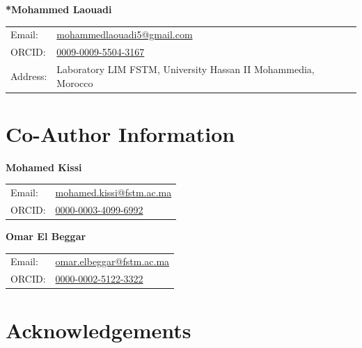 \documentclass[a4paper,12pt]{article}
\begin{document}
\textbf{*Mohammed Laouadi}

\begin{tabular}{ll}
    Email: & \href{mailto:mohammedlaouadi5@gmail.com}{mohammedlaouadi5@gmail.com} \\
    ORCID: & \href{https://orcid.org/0009-0009-5504-3167}{0009-0009-5504-3167} \\
    Address: & Laboratory LIM FSTM, University Hassan II Mohammedia, Morocco \\
\end{tabular}

\vspace{1cm}

\section*{Co-Author Information}

\textbf{Mohamed Kissi}

\begin{tabular}{ll}
    Email: & \href{mailto:mohamed.kissi@fstm.ac.ma}{mohamed.kissi@fstm.ac.ma} \\
    ORCID: & \href{https://orcid.org/0000-0003-4099-6992}{0000-0003-4099-6992} \\
\end{tabular}

\vspace{0.5cm}

\textbf{Omar El Beggar}

\begin{tabular}{ll}
    Email: & \href{mailto:omar.elbeggar@fstm.ac.ma}{omar.elbeggar@fstm.ac.ma} \\
    ORCID: & \href{https://orcid.org/0000-0002-5122-3322}{0000-0002-5122-3322} \\
\end{tabular}

\vspace{1cm}

\section*{Acknowledgements}
\end{document}
